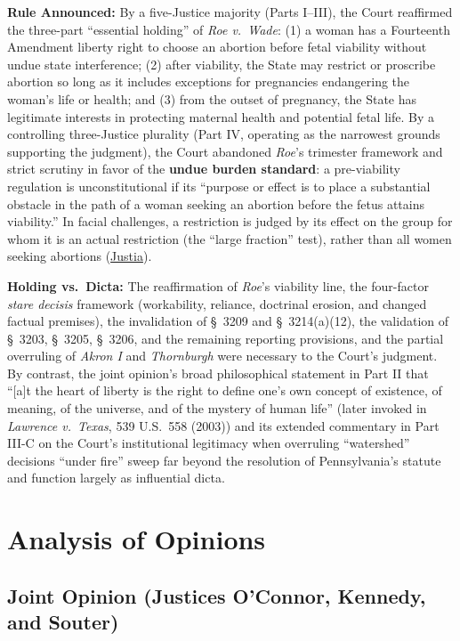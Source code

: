 \documentclass[12pt]{article}
\begin{document}
\textbf{Rule Announced:} By a five-Justice majority (Parts I--III), the Court reaffirmed the three-part ``essential holding'' of \textit{Roe v.\ Wade}: (1) a woman has a Fourteenth Amendment liberty right to choose an abortion before fetal viability without undue state interference; (2) after viability, the State may restrict or proscribe abortion so long as it includes exceptions for pregnancies endangering the woman's life or health; and (3) from the outset of pregnancy, the State has legitimate interests in protecting maternal health and potential fetal life. By a controlling three-Justice plurality (Part IV, operating as the narrowest grounds supporting the judgment), the Court abandoned \textit{Roe}'s trimester framework and strict scrutiny in favor of the \textbf{undue burden standard}: a pre-viability regulation is unconstitutional if its ``purpose or effect is to place a substantial obstacle in the path of a woman seeking an abortion before the fetus attains viability.'' In facial challenges, a restriction is judged by its effect on the group for whom it is an actual restriction (the ``large fraction'' test), rather than all women seeking abortions (\href{https://supreme.justia.com/cases/federal/us/505/833/}{Justia}).

\textbf{Holding vs.\ Dicta:} The reaffirmation of \textit{Roe}'s viability line, the four-factor \textit{stare decisis} framework (workability, reliance, doctrinal erosion, and changed factual premises), the invalidation of \S\ 3209 and \S\ 3214(a)(12), the validation of \S\ 3203, \S\ 3205, \S\ 3206, and the remaining reporting provisions, and the partial overruling of \textit{Akron I} and \textit{Thornburgh} were necessary to the Court's judgment. By contrast, the joint opinion's broad philosophical statement in Part II that ``[a]t the heart of liberty is the right to define one's own concept of existence, of meaning, of the universe, and of the mystery of human life'' (later invoked in \textit{Lawrence v.\ Texas}, 539 U.S.\ 558 (2003)) and its extended commentary in Part III-C on the Court's institutional legitimacy when overruling ``watershed'' decisions ``under fire'' sweep far beyond the resolution of Pennsylvania's statute and function largely as influential dicta.

\section{Analysis of Opinions}

\subsection{Joint Opinion (Justices O'Connor, Kennedy, and Souter)}
\end{document}
